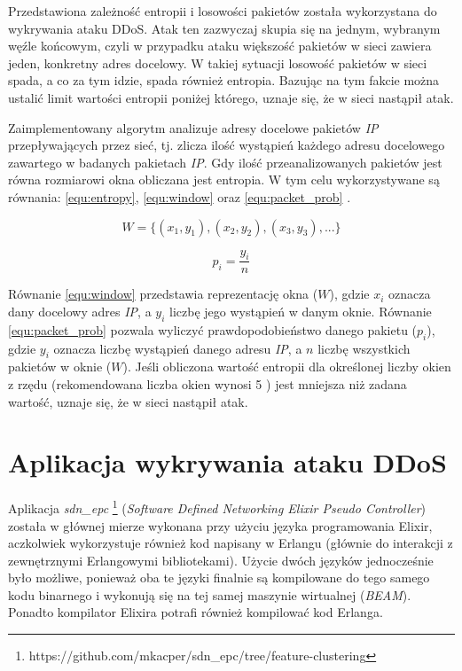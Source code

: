 Przedstawiona zależność entropii i losowości pakietów została wykorzystana do
wykrywania ataku DDoS. Atak ten zazwyczaj skupia się na jednym, wybranym węźle
końcowym, czyli w przypadku ataku większość pakietów w sieci zawiera jeden,
konkretny adres docelowy. W takiej sytuacji losowość pakietów w sieci spada, a
co za tym idzie, spada również entropia. Bazując na tym fakcie można ustalić
limit wartości entropii poniżej którego, uznaje się, że w sieci nastąpił atak.

Zaimplementowany algorytm analizuje adresy docelowe pakietów \textit{IP}
przepływających przez sieć, tj. zlicza ilość wystąpień każdego adresu docelowego
zawartego w badanych pakietach \textit{IP}. Gdy ilość przeanalizowanych pakietów
jest równa rozmiarowi okna obliczana jest entropia. W tym celu wykorzystywane są
równania: \ref{equ:entropy}, \ref{equ:window} \cite{mainddosarticle} oraz
\ref{equ:packet_prob} \cite{mainddosarticle}.

\begin{equation}
W = \{(x_{1},y_{1}),(x_{2},y_{2}),(x_{3},y_{3}),...\}
\label{equ:window}
\end{equation}

\begin{equation}
p_{i} = \frac{y_{i}}{n}
\label{equ:packet_prob}
\end{equation}

Równanie \ref{equ:window} przedstawia reprezentację okna ($W$), gdzie $x_{i}$
oznacza dany docelowy adres \textit{IP}, a $y_{i}$ liczbę jego wystąpień w danym
oknie. Równanie \ref{equ:packet_prob} pozwala wyliczyć prawdopodobieństwo
danego pakietu ($p_{i}$), gdzie $y_{i}$ oznacza liczbę wystąpień danego adresu
\textit{IP}, a $n$ liczbę wszystkich pakietów w oknie ($W$).
Jeśli obliczona wartość entropii dla określonej liczby okien z rzędu
(rekomendowana liczba okien  wynosi 5 \cite{mainddosarticle}) jest mniejsza niż
zadana wartość, uznaje się, że w sieci nastąpił atak. 

\section{Aplikacja wykrywania ataku DDoS}

Aplikacja \textit{sdn\_epc}
\footnote{https://github.com/mkacper/sdn\_epc/tree/feature-clustering}
(\textit{Software Defined Networking Elixir Pseudo Controller}) została w
głównej mierze wykonana przy użyciu języka programowania Elixir, aczkolwiek
wykorzystuje również kod napisany w Erlangu (głównie do interakcji z
zewnętrznymi Erlangowymi bibliotekami). Użycie dwóch języków jednocześnie było
możliwe, ponieważ oba te języki finalnie są kompilowane do tego samego kodu
binarnego i wykonują się na tej samej maszynie wirtualnej (\textit{BEAM}).
Ponadto kompilator Elixira potrafi również kompilować kod Erlanga.

